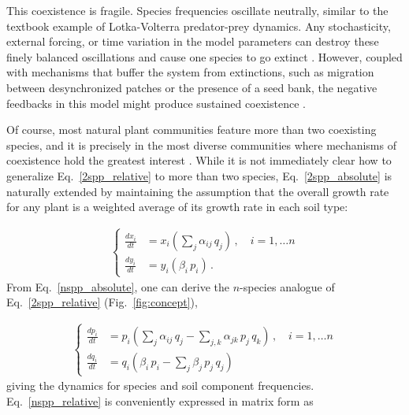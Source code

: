 \documentclass[11pt]{article}
\begin{document}
This coexistence is fragile. Species frequencies oscillate neutrally, similar to the textbook example of Lotka-Volterra predator-prey dynamics. Any stochasticity, external forcing, or time variation in the model parameters can destroy these finely balanced oscillations and cause one species to go extinct \citep{revilla2013plant}. However, coupled with mechanisms that buffer the system from extinctions, such as migration between desynchronized patches or the presence of a seed bank, the negative feedbacks in this model might produce sustained coexistence \citep{revilla2013plant, bever2003soil}. 

Of course, most natural plant communities feature more than two coexisting species, and it is precisely in the most diverse communities where mechanisms of coexistence hold the greatest interest \citep{van2013plant}. While it is not immediately clear how to generalize Eq.~\ref{2spp_relative} to more than two species, Eq.~\ref{2spp_absolute} is naturally extended by maintaining the assumption that the overall growth rate for any plant is a weighted average of its growth rate in each soil type:

\begin{align} \label{nspp_absolute}
\begin{cases}
\frac{dx_i}{dt} &= x_i \left(\sum_{j} \alpha_{ij} \, q_j \right) \, , \quad  i = 1, \dots n \\
\frac{dy_i}{dt} &= y_i \left( \beta_i \, p_i \right) \, .
\end{cases}
\end{align}
From Eq.~\ref{nspp_absolute}, one can derive the $n$-species analogue of Eq.~\ref{2spp_relative} (Fig.~\ref{fig:concept}),

\begin{align} \label{nspp_relative}
\begin{cases}
\frac{dp_i}{dt} &= p_i \left(\sum_{j} \alpha_{ij} \, q_j - \sum_{j, k} \alpha_{jk} \, p_j \, q_k \right) \, , \quad  i = 1, \dots n \\
\frac{dq_i}{dt} &= q_i \left(\beta_{i} \, p_i - \sum_{j} \beta_{j} \, p_j \, q_j  \right) \,
\end{cases}
\end{align}
giving the dynamics for species and soil component frequencies. Eq.~\ref{nspp_relative} is conveniently expressed in matrix form as
\end{document}

